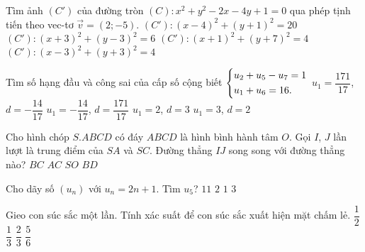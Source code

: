 \begin{ex}%
	Tìm ảnh $ (C') $ của đường tròn $ (C)\colon x^2+y^2-2x-4y+1=0 $ qua phép tịnh tiến theo vec-tơ $ \overrightarrow{v}=(2;-5) $.
	\choice
	{$ (C')\colon (x-4)^2+(y+1)^2=20 $}
	{$ (C')\colon (x+3)^2+(y-3)^2=6 $}
	{$ (C')\colon (x+1)^2+(y+7)^2=4 $}
	{\True $ (C')\colon (x-3)^2+(y+3)^2=4 $}
\end{ex}
\begin{ex}%
	Tìm số hạng đầu và công sai của cấp số cộng biết $ \left\{\begin{aligned}&u_2+u_5-u_7=1\\&u_1+u_6=16.\end{aligned}\right. $
	\choice
	{$ u_1=\dfrac{171}{17} $, $ d=-\dfrac{14}{17} $}
	{$ u_1=-\dfrac{14}{17} $, $ d=\dfrac{171}{17} $}
	{$ u_1=2 $, $ d=3 $}
	{\True $ u_1=3 $, $ d=2 $}
\end{ex}
\begin{ex}%
	Cho hình chóp $ S.ABCD $ có đáy $ ABCD $ là hình bình hành tâm $ O $. Gọi $ I $, $ J $ lần lượt là trung điểm của $ SA $ và $ SC $. Đường thẳng $ IJ $ song song với đường thẳng nào? 
	\choice
	{$ BC $}
	{\True $ AC $}
	{$ SO $}
	{$ BD $}
\end{ex}
\begin{ex}%
	Cho dãy số $ \left(u_n\right) $ với $ u_n=2n+1 $. Tìm $ u_5 $? 
	\choice
	{\True $ 11 $}
	{$ 2 $}
	{$ 1 $}
	{$ 3 $}
\end{ex}
\begin{ex}%
	Gieo con súc sắc một lần. Tính xác suất để con súc sắc xuất hiện mặt chấm lẻ. 
	\choice
	{\True $ \dfrac{1}{2} $}
	{$ \dfrac{1}{3} $}
	{$ \dfrac{2}{3} $}
	{$ \dfrac{5}{6} $}
\end{ex}
